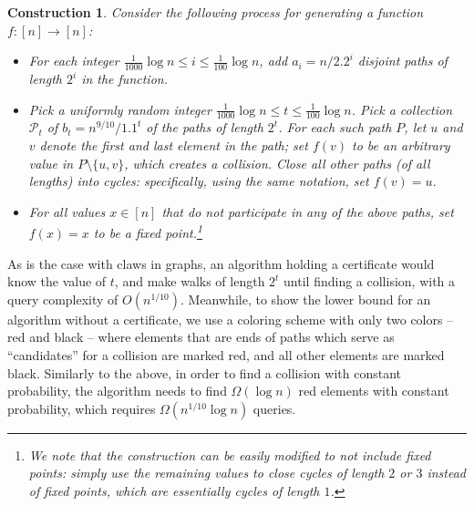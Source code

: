 \documentclass[11pt]{article}
\numberwithin{equation}{section}
\newtheorem{construction}[construction]{Construction}
\renewcommand{\P}{\mathcal{P}}
\newcommand{\1}{\mathbf{1}}
\begin{document}
\begin{construction}
\label{const:collision_construction}
Consider the following process for generating a function $f \colon [n] \to [n]$:
\begin{itemize}
    \item For each integer $\frac{1}{1000}  \log n \leq i \leq \frac{1}{100} \log n$, add $a_i = n / 2.2^i$ disjoint paths of length $2^i$ in the function. 
    
    \item Pick a uniformly random integer $\frac{1}{1000} \log n \leq t \leq \frac{1}{100} \log n$. Pick a collection $\P_t$ of $b_t = n^{9/10} / 1.1^t$ of the paths of length $2^t$. For each such path $P$, let $u$ and $v$ denote the first and last element in the path; set $f(v)$ to be an arbitrary value in $P \setminus \{u,v\}$, which creates a collision. Close all other paths (of all lengths) into cycles: specifically, using the same notation, set $f(v)=u$.
    
    \item For all values $x \in [n]$ that do not participate in any of the above paths, set $f(x) = x$ to be a fixed point.\footnote{We note that the construction can be easily modified to not include fixed points: simply use the remaining values to close cycles of length $2$ or $3$ instead of fixed points, which are essentially cycles of length $1$.}
\end{itemize}
\end{construction}

As is the case with claws in graphs, an algorithm holding a certificate would know the value of $t$, and make walks of length $2^t$ until finding a collision, with a query complexity of $O(n^{1/10})$. Meanwhile, to show the lower bound for an algorithm without a certificate, we use a coloring scheme with only two colors -- red and black -- where elements that are ends of paths which serve as ``candidates'' for a collision are marked red, and all other elements are marked black. Similarly to the above, in order to find a collision with constant probability, the algorithm needs to find $\Omega(\log n)$ red elements with constant probability, which requires $\Omega(n^{1/10} \log n)$ queries.
\end{document}
